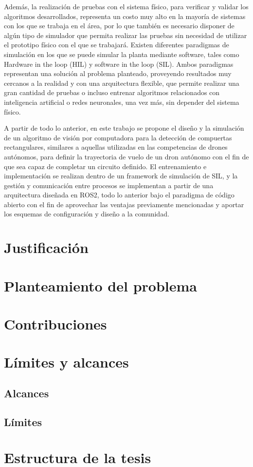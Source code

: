 Además, la realización de pruebas con el sistema físico, para verificar y validar los algoritmos desarrollados, representa un costo muy alto en la mayoría de sistemas con los que se trabaja en el área, por lo que también es necesario disponer de algún tipo de simulador que permita realizar las pruebas sin necesidad de utilizar el prototipo físico con el que se trabajará. Existen diferentes paradigmas de simulación en los que se puede simular la planta mediante software, tales como Hardware in the loop (HIL) y software in the loop (SIL). Ambos paradigmas representan una solución al problema planteado, proveyendo resultados muy cercanos a la realidad y con una arquitectura flexible, que permite realizar una gran cantidad de pruebas o incluso entrenar algoritmos relacionados con inteligencia artificial o redes neuronales, una vez más, sin depender del sistema físico. 

A partir de todo lo anterior, en este trabajo se propone el diseño y la simulación de un algoritmo de visión por computadora para la detección de compuertas rectangulares, similares a aquellas utilizadas en las competencias de drones autónomos, para definir la trayectoria de vuelo de un dron autónomo con el fin de que sea capaz de completar un circuito definido.  El entrenamiento e implementación se realizan dentro de un framework de simulación de SIL, y la gestión y comunicación entre procesos se implementan a partir de una arquitectura diseñada en ROS2, todo lo anterior bajo el paradigma de código abierto con el fin de aprovechar las ventajas previamente mencionadas y aportar los esquemas de configuración y diseño a la comunidad.

\vfill

\section{Justificación}


\section{Planteamiento del problema}


 \section{Contribuciones}


\section{Límites y alcances}

\subsection{Alcances}


\subsection{Límites}



\section{Estructura de la tesis}






